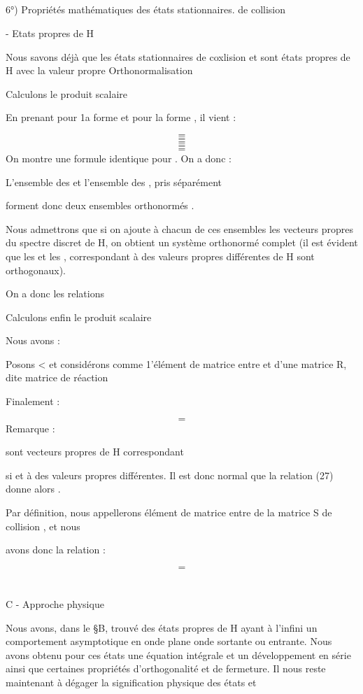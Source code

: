 \subsection{}%
6°) Propriétés mathématiques des états stationnaires. de collision

- Etats propres de H

Nous savons déjà que les états stationnaires de coxlision
et  sont états propres de H avec la valeur propre 
 Orthonormalisation

Calculons le produit scalaire 

En prenant pour  1a forme  et pour  la forme
, il vient :

%
\[
\tag{22}=
\]
\[
\tag{23}=
\]
\[
\tag{24}=
\]
\[
\tag{25}=
\]
\[
\tag{26}=
\]
On montre une formule identique pour  . On a donc :

L'ensemble des et l'ensemble des  , pris séparément

forment donc deux ensembles orthonormés .

Nous admettrons que si on ajoute à chacun de ces ensembles
les vecteurs propres  du spectre discret de H, on obtient un système orthonormé
complet (il est évident que les  et les  , correspondant à des valeurs propres
différentes de H sont orthogonaux).

On a donc les relations

Calculons enfin le produit scalaire 

Nous avons :

Posons < et considérons  comme 1'élément de matrice entre  et  d'une matrice R,
dite matrice de
réaction


Finalement :

\[
\tag{27}=
\]
Remarque :

 sont vecteurs propres de H correspondant

si  et 
à des valeurs propres différentes. Il est donc normal que la relation
(27) donne alors
.

Par définition, nous appellerons élément de matrice entre
 de la matrice S de collision , et nous

avons donc la relation :

\[
\tag{28}=
\]

\section{}%
C - Approche physique

Nous avons, dans le \S B, trouvé des états propres de H
ayant à l'infini un comportement asymptotique en onde plane  onde sortante ou
entrante. Nous avons obtenu pour ces états une équation intégrale et un développement
en série ainsi que certaines propriétés d'orthogonalité et de fermeture.
Il nous reste maintenant à dégager la signification physique des états  et 

